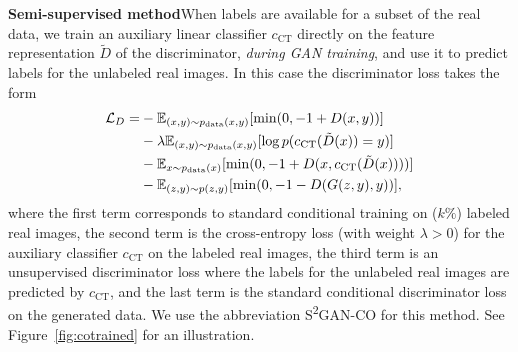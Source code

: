 \documentclass{article}
\newcommand{\pdata}{p_{\rm{data}}}
\newcommand{\E}{\mathbb{E}}
\newcommand{\Ls}{\mathcal{L}}
\newcommand{\cCT}{c_\text{CT}}
\newcommand{\Dt}{\tilde D}
\newcommand{\cotrainSS}{\textsc{S\textsuperscript{2}GAN-CO}}
\begin{document}
\textbf{Semi-supervised method}\quad When labels are available for a subset of the real data, we train an auxiliary linear classifier $\cCT$ directly on the feature representation $\Dt$ of the discriminator, \emph{during GAN training}, and use it to predict labels for the unlabeled real images. In this case the discriminator loss takes the form
\begin{align}
\Ls_D = &- \E_{(x, y) \sim \pdata(x,y)}[\min(0, -1+D(x, y))] \nonumber \\
& - \lambda \E_{(x, y) \sim \pdata(x,y)}[\log p(\cCT(\Dt(x))=y)] \nonumber \\
& - \E_{x \sim \pdata(x)}[\min(0, -1+D(x, \cCT(\Dt(x))))] \nonumber \\
& - \E_{(z,y) \sim p(z,y)}[\min(0,-1-D(G(z,y),y))], \label{eq:cotrain}
\end{align}
where the first term corresponds to standard conditional training on ($k\%$) labeled real images, the second term is the cross-entropy loss (with weight $\lambda>0$) for the auxiliary classifier $\cCT$ on the labeled real images, the third term is an unsupervised discriminator loss where the labels for the unlabeled real images are predicted by $\cCT$, and the last term is the standard conditional discriminator loss on the generated data. We use the abbreviation \cotrainSS{} for this method. See Figure~\ref{fig:cotrained} for an illustration.
\end{document}
